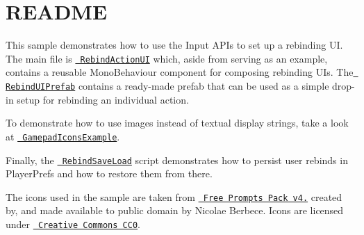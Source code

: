 \chapter{README}
\hypertarget{md__hey_tea_9_2_library_2_package_cache_2com_8unity_8inputsystem_0d1_86_83_2_samples_0i_2_rebinding_u_i_2_r_e_a_d_m_e}{}\label{md__hey_tea_9_2_library_2_package_cache_2com_8unity_8inputsystem_0d1_86_83_2_samples_0i_2_rebinding_u_i_2_r_e_a_d_m_e}
This sample demonstrates how to use the Input  APIs to set up a rebinding UI. The main file is \href{./RebindActionUI.cs}{\texttt{ Rebind\+Action\+UI}} which, aside from serving as an example, contains a reusable {\ttfamily Mono\+Behaviour} component for composing rebinding UIs. The \href{./RebindUIPrefab.prefab}{\texttt{ Rebind\+UIPrefab}} contains a ready-\/made prefab that can be used as a simple drop-\/in setup for rebinding an individual action.

To demonstrate how to use images instead of textual display strings, take a look at \href{./GamepadIconsExample.cs}{\texttt{ Gamepad\+Icons\+Example}}.

Finally, the \href{./RebindSaveLoad.cs}{\texttt{ Rebind\+Save\+Load}} script demonstrates how to persist user rebinds in {\ttfamily Player\+Prefs} and how to restore them from there.

The icons used in the sample are taken from \href{https://opengameart.org/content/free-keyboard-and-controllers-prompts-pack}{\texttt{ Free Prompts Pack v4.}} created by, and made available to public domain by Nicolae Berbece. Icons are licensed under \href{https://creativecommons.org/publicdomain/zero/1.0/}{\texttt{ Creative Commons CC0}}. 